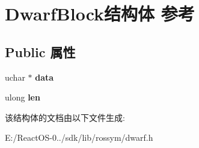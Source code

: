 \hypertarget{struct_dwarf_block}{}\section{Dwarf\+Block结构体 参考}
\label{struct_dwarf_block}
\subsection*{Public 属性}
\begin{DoxyCompactItemize}
\item 
\mbox{\label{struct_dwarf_block_a1da8c8d909805f6d2e687b33310668c2}} 
uchar $\ast$ {\bfseries data}
\item 
\mbox{\label{struct_dwarf_block_afae71e9ff51a29b280900b10600baaf6}} 
ulong {\bfseries len}
\end{DoxyCompactItemize}


该结构体的文档由以下文件生成\+:\begin{DoxyCompactItemize}
\item 
E\+:/\+React\+O\+S-\/0../sdk/lib/rossym/dwarf.\+h\end{DoxyCompactItemize}

